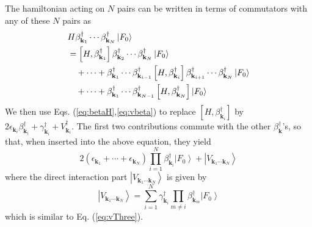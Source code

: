 \documentclass[epj]{svjour}
\newcommand{\vk}{\ensuremath{\mathbf{k}}}
\begin{document}
The hamiltonian acting on $N$ pairs can be written in terms of commutators with any of these $N$ pairs as 
\begin{equation}\label{eq:HN}
\begin{split}
&H\beta^{\dagger}_{\mathbf{k} _1}\cdots\beta^{\dagger}_{\mathbf{k}
_N}\left|F_0\right> \\
&=\left[H,\beta^{\dagger}_{\mathbf{k} _1}\right]  \beta^{\dagger}_{%
\mathbf{k} _2}\cdots\beta^{\dagger}_{\mathbf{k} _N}\left|F_0\right> \\
&\quad+\cdots+\beta^{\dagger}_{\mathbf{k} _1}\cdots\beta^{\dagger}_{\mathbf{k} _{i-1}}
\left[H,\beta^{\dagger}_{\mathbf{k} _i}\right]  \beta^{\dagger}_{\mathbf{k}
_{i+1}}\cdots \beta^{\dagger}_{\mathbf{k}_{N}}\left|F_0\right>\\
&\quad+\cdots+\beta^{\dagger}_{\mathbf{k} _1}\cdots\beta^{\dagger}_{\mathbf{k} _{N-1}}
\left[H,\beta^{\dagger}_{\mathbf{k} _N}\right] \left|F_0\right>
\end{split}
\end{equation}
We then use Eqs. (\ref{eq:betaH},\ref{eq:vbeta}) to replace $\left[H,\beta^{\dagger}_{\mathbf{k} _i}\right]$ by $2\epsilon_{\vk_i}\beta^{\dagger}_{\vk_i}+\gamma^{\dagger}_{\vk_i}+V^{\dagger}_{\vk_i}$.  The first two contributions commute with the other $\beta^\dagger_\vk$'s, so that, when inserted into the above equation, they yield
\begin{equation}
2\left(\epsilon_{\mathbf{k} _1}+\cdots+\epsilon_{\mathbf{k} _N}\right)
\prod^N_{i=1}\beta^{\dagger}_{\mathbf{k} _i}\left|F_0\right>+\left|{V}_{\mathbf{k} _1\cdots\mathbf{k} _N}\right> 
\end{equation}
where the direct interaction part $\left|{V}_{\mathbf{k} _1\cdots\mathbf{k} _N}\right>$ is given by 
\begin{equation}  
\left|V_{\mathbf{k} _1\cdots\mathbf{k} _N}\right> =\sum^N_{i=1}\gamma^{\dagger}_{\mathbf{k}_i}\prod_{m\neq{i}}\beta^{\dagger}_{\mathbf{k} _m}\left|F_0\right>   
\end{equation}
which is similar to Eq. (\ref{eq:vThree}). 
\end{document}
